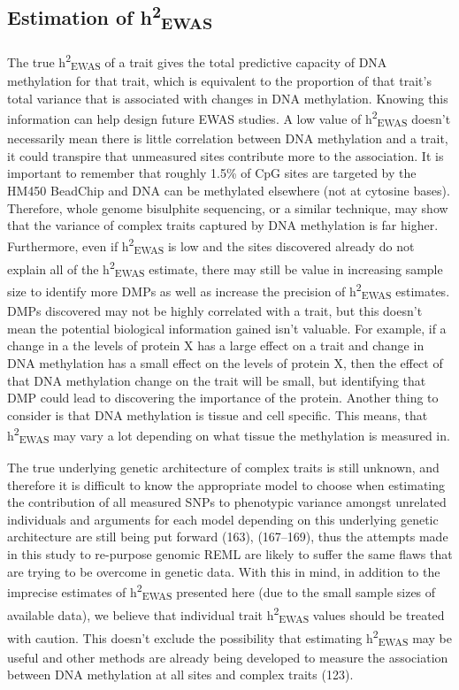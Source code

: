 \documentclass[11pt,oneside]{bristolthesis}
\begin{document}
\hypertarget{estimation-of-h2ewas}{%
\subsection{\texorpdfstring{Estimation of h\textsuperscript{2}\textsubscript{EWAS}}{Estimation of h2EWAS}}\label{estimation-of-h2ewas}}

The true h\textsuperscript{2}\textsubscript{EWAS} of a trait gives the total predictive capacity of DNA methylation for that trait, which is equivalent to the proportion of that trait's total variance that is associated with changes in DNA methylation. Knowing this information can help design future EWAS studies. A low value of h\textsuperscript{2}\textsubscript{EWAS} doesn't necessarily mean there is little correlation between DNA methylation and a trait, it could transpire that unmeasured sites contribute more to the association. It is important to remember that roughly 1.5\% of CpG sites are targeted by the HM450 BeadChip and DNA can be methylated elsewhere (not at cytosine bases). Therefore, whole genome bisulphite sequencing, or a similar technique, may show that the variance of complex traits captured by DNA methylation is far higher. Furthermore, even if h\textsuperscript{2}\textsubscript{EWAS} is low and the sites discovered already do not explain all of the h\textsuperscript{2}\textsubscript{EWAS} estimate, there may still be value in increasing sample size to identify more DMPs as well as increase the precision of h\textsuperscript{2}\textsubscript{EWAS} estimates. DMPs discovered may not be highly correlated with a trait, but this doesn't mean the potential biological information gained isn't valuable. For example, if a change in a the levels of protein X has a large effect on a trait and change in DNA methylation has a small effect on the levels of protein X, then the effect of that DNA methylation change on the trait will be small, but identifying that DMP could lead to discovering the importance of the protein. Another thing to consider is that DNA methylation is tissue and cell specific. This means, that h\textsuperscript{2}\textsubscript{EWAS} may vary a lot depending on what tissue the methylation is measured in.

The true underlying genetic architecture of complex traits is still unknown, and therefore it is difficult to know the appropriate model to choose when estimating the contribution of all measured SNPs to phenotypic variance amongst unrelated individuals and arguments for each model depending on this underlying genetic architecture are still being put forward (163), (167--169), thus the attempts made in this study to re-purpose genomic REML are likely to suffer the same flaws that are trying to be overcome in genetic data. With this in mind, in addition to the imprecise estimates of h\textsuperscript{2}\textsubscript{EWAS} presented here (due to the small sample sizes of available data), we believe that individual trait h\textsuperscript{2}\textsubscript{EWAS} values should be treated with caution. This doesn't exclude the possibility that estimating h\textsuperscript{2}\textsubscript{EWAS} may be useful and other methods are already being developed to measure the association between DNA methylation at all sites and complex traits (123).
\end{document}

